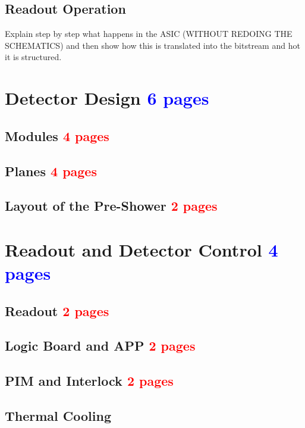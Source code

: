 		\subsection{Readout Operation}
		Explain step by step what happens in the ASIC (WITHOUT REDOING THE SCHEMATICS) and then show how this is translated into the bitstream and hot it is structured. 		




		
		
		
		
		
		
		
		
		
		
		
	\clearpage
	\section{Detector Design \textcolor{blue}{ 6 pages}}
		\subsection{Modules \textcolor{red}{ 4 pages}}
		\subsection{Planes \textcolor{red}{ 4 pages}}
		\subsection{Layout of the Pre-Shower  \textcolor{red}{ 2 pages}}
		
	\clearpage	
	\section{Readout and Detector Control  \textcolor{blue}{ 4 pages}}
		\subsection{Readout \textcolor{red}{ 2 pages}}
		\subsection{Logic Board and APP \textcolor{red}{ 2 pages}}
		\subsection{PIM and Interlock \textcolor{red}{ 2 pages}}
		\subsection{Thermal Cooling}